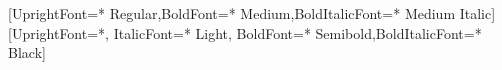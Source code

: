 \usepackage[utf8]{inputenc}
\usepackage[english]{babel}
\usepackage{amsfonts}
\usepackage{amssymb}
\usepackage{amsmath}

\usepackage{xspace}
\usepackage{iftex}

\usepackage[natbib,
style=authortitle,
maxbibnames=6,
maxcitenames=2,
citestyle=authoryear-comp,
backend=biber]{biblatex}



\usepackage{hyperref}
\usepackage[usenames]{xcolor}
\usepackage{grffile}
\usepackage{graphicx}

\ifXeTeX
    \usepackage[no-math]{fontspec}
    \setsansfont{Avenir Next}[UprightFont={* Regular},BoldFont={* Medium},BoldItalicFont={* Medium Italic}]
    \setmonofont{Source Code Pro}[UprightFont={*}, ItalicFont={* Light}, BoldFont={* Semibold},BoldItalicFont={* Black}]

\else
    \usepackage{fourier}
\fi
